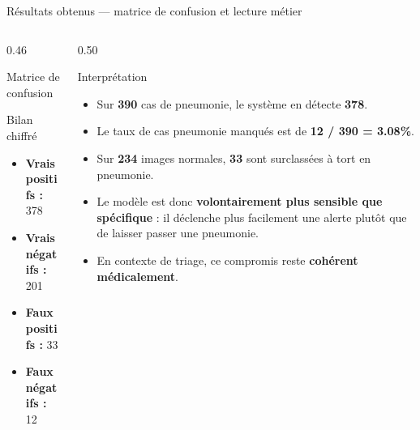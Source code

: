 \begin{frame}{Résultats obtenus — matrice de confusion et lecture métier}
\footnotesize
\begin{columns}[T,onlytextwidth]
\begin{column}{0.46\textwidth}
\begin{block}{Matrice de confusion}
\centering
\renewcommand{\arraystretch}{1.25}
\captionsetup{type=table}
\end{block}
\begin{block}{Bilan chiffré}
\begin{itemize}
\item \textbf{Vrais positifs :} 378
\item \textbf{Vrais négatifs :} 201
\item \textbf{Faux positifs :} 33
\item \textbf{Faux négatifs :} 12
\end{itemize}
\end{block}
\end{column}
\begin{column}{0.50\textwidth}
\begin{block}{Interprétation}
\begin{itemize}
\item Sur \textbf{390} cas de pneumonie, le système en détecte \textbf{378}.
\item Le taux de cas pneumonie manqués est de \textbf{12 / 390 = 3.08\%}.
\item Sur \textbf{234} images normales, \textbf{33} sont surclassées à tort en pneumonie.
\item Le modèle est donc \textbf{volontairement plus sensible que spécifique} : il déclenche plus facilement une alerte plutôt que de laisser passer une pneumonie.
\item En contexte de triage, ce compromis reste \textbf{cohérent médicalement}.
\end{itemize}
\end{block}
\end{column}
\end{columns}
\end{frame}

